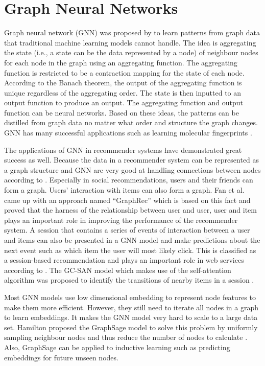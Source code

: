 \documentclass[11pt,twoside]{report}
\begin{document}
\section{Graph Neural Networks}
Graph neural network (GNN) was proposed by \cite{gori_new_2005, scarselli_graph_2009} to learn patterns from graph data that traditional machine learning models cannot handle. The idea is aggregating the state (i.e., a state can be the data represented by a node) of neighbour nodes for each node in the graph using an aggregating function. The aggregating function is restricted to be a contraction mapping for the state of each node. According to the Banach theorem, the output of the aggregating function is unique regardless of the aggregating order. The state is then inputted to an output function to produce an output. The aggregating function and output function can be neural networks. Based on these ideas, the patterns can be distilled from graph data no matter what order and structure the graph changes. GNN has many successful applications such as learning molecular fingerprints \cite{duvenaud_convolutional_2015}.

The applications of GNN in recommender systems have demonstrated great success as well. Because the data in a recommender system can be represented as a graph structure and GNN are very good at handling connections between nodes according to \cite{wu_graph_2020}. Especially in social recommendations, users and their friends can form a graph. Users’ interaction with items can also form a graph. Fan et al. came up with an approach named “GraphRec” which is based on this fact \cite{fan_graph_2019} and proved that the harness of the relationship between user and user, user and item plays an important role in improving the performance of the recommender system. A session that contains a series of events of interaction between a user and items can also be presented in a GNN model and make predictions about the next event such as which item the user will most likely click. This is classified as a session-based recommendation and plays an important role in web services according to \cite{xu_graph_2019}. The GC-SAN model which makes use of the self-attention algorithm was proposed to identify the transitions of nearby items in a session \cite{xu_graph_2019}.

Most GNN models use low dimensional embedding to represent node features to make them more efficient. However, they still need to iterate all nodes in a graph to learn embeddings. It makes the GNN model very hard to scale to a large data set. Hamilton \cite{hamilton_inductive_2018} proposed the GraphSage model to solve this problem by uniformly sampling neighbour nodes and thus reduce the number of nodes to calculate \cite{hamilton_inductive_2018}. Also, GraphSage can be applied to inductive learning such as predicting embeddings for future unseen nodes.
\end{document}
